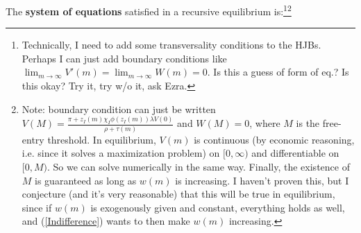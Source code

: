 \documentclass[12pt,english]{article}
\theoremstyle{remark}
\begin{document}
The\textbf{ system of equations} satisfied in a recursive equilibrium is:\footnote{Technically, I need to add some transversality conditions to the HJBs. Perhaps I can just add boundary conditions like $\lim_{m\to \infty} V'(m) = \lim_{m \to \infty} W(m) = 0$. Is this a guess of form of eq.? Is this okay? Try it, try w/o it, ask Ezra.}\footnote{Note: boundary condition can just be written $V(M) = \frac{\pi + z_I(m)\chi_I \phi(z_I(m))\lambda V(0)}{\rho + \tau(m)}$ and $W(M) = 0$, where $M$ is the free-entry threshold. In equilibrium, $V(m)$ is continuous (by economic reasoning, i.e. since it solves a maximization problem) on $[0,\infty)$ and differentiable on $[0,M)$. So we can solve numerically in the same way. Finally, the existence of $M$ is guaranteed as long as $w(m)$ is increasing. I haven't proven this, but I conjecture (and it's very reasonable) that this will be true in equilibrium, since if $w(m)$ is exogenously given and constant, everything holds as well, and (\ref{Indifference}) wants to then make $w(m)$ increasing.} 
\end{document}
